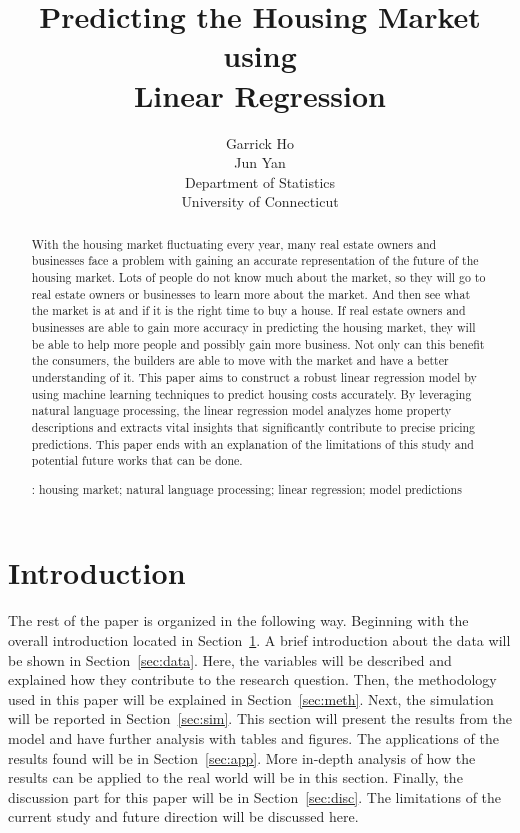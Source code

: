 \documentclass[12pt]{article}
\title{Predicting the Housing Market using \\ Linear Regression}
\author{Garrick Ho\\
  Jun Yan\\[1ex]
  Department of Statistics\\
  University of Connecticut\\
}
\begin{document}
\maketitle
\doublespace

\begin{abstract}
With the housing market fluctuating every year, many real estate owners and businesses face a problem with gaining an accurate representation of the future of the housing market. Lots of people do not know much about the market, so they will go to real estate owners or businesses to learn more about the market. And then see what the market is at and if it is the right time to buy a house. If real estate owners and businesses are able to gain more accuracy in predicting the housing market, they will be able to help more people and possibly gain more business. Not only can this benefit the consumers, the builders are able to move with the market and have a better understanding of it. This paper aims to construct a robust linear regression model by using machine learning techniques to predict housing costs accurately. By leveraging natural language processing, the linear regression model analyzes home property descriptions and extracts vital insights that significantly contribute to precise pricing predictions. This paper ends with an explanation of the limitations of this study and potential future works that can be done.

\bigskip
{}:
housing market;
natural language processing;
linear regression;
model predictions


\end{abstract}

\section{Introduction}
\label{sec:intro}





The rest of the paper is organized in the following way. Beginning with the overall introduction located in Section~\ref{sec:intro}. A brief introduction about the data will be shown in Section~\ref{sec:data}. Here, the variables will be described and explained how they contribute to the research question. Then, the methodology used in this paper will be explained in Section~\ref{sec:meth}. Next, the simulation will be reported in Section~\ref{sec:sim}. This section will present the results from the model and have further analysis with tables and figures. The applications of the results found will be in Section~\ref{sec:app}. More in-depth analysis of how the results can be applied to the real world will be in this section. Finally, the discussion part for this paper will be in Section~\ref{sec:disc}. The limitations of the current study and future direction will be discussed here.
\end{document}
